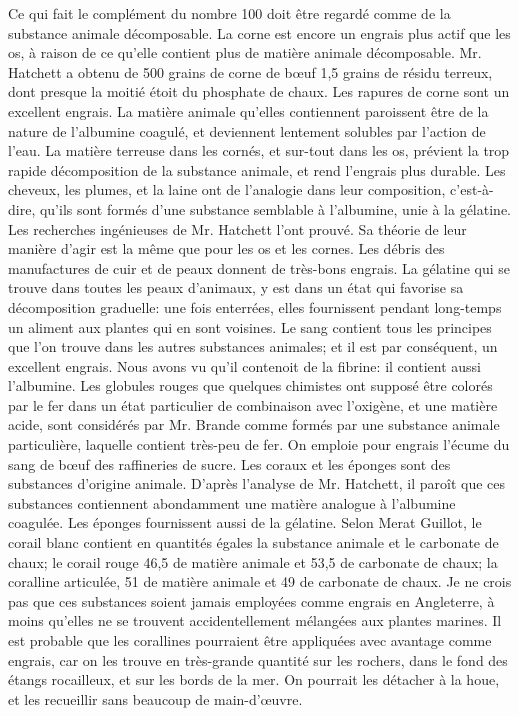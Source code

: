 Ce qui fait le complément du nombre 100 doit être regardé comme de la substance animale décomposable.
La corne est encore un engrais plus actif que les os, à raison de ce qu'elle contient plus de matière animale décomposable. Mr. Hatchett a obtenu de 500 grains de corne de bœuf 1,5 grains de résidu terreux, dont presque la moitié étoit du phosphate de chaux. Les rapures de corne sont un excellent engrais. La matière animale qu'elles contiennent\setcounter{page}{171} paroissent être de la nature de l'albumine coagulé, et deviennent lentement solubles par l'action de l'eau. La matière terreuse dans les cornés, et sur-tout dans les os, prévient la trop rapide décomposition de la substance animale, et rend l'engrais plus durable.
Les cheveux, les plumes, et la laine ont de l'analogie dans leur composition, c'est-à-dire, qu'ils sont formés d'une substance semblable à l'albumine, unie à la gélatine. Les recherches ingénieuses de Mr. Hatchett l'ont prouvé. Sa théorie de leur manière d'agir est la même que pour les os et les cornes.
Les débris des manufactures de cuir et de peaux donnent de très-bons engrais. La gélatine qui se trouve dans toutes les peaux d'animaux, y est dans un état qui favorise sa décomposition graduelle: une fois enterrées, elles fournissent pendant long-temps un aliment aux plantes qui en sont voisines.
Le sang contient tous les principes que l'on trouve dans les autres substances animales; et il est par conséquent, un excellent engrais. Nous avons vu qu'il contenoit de la fibrine: il contient aussi l'albumine. Les globules rouges que quelques chimistes ont supposé être colorés par le fer dans un état particulier\setcounter{page}{172} de combinaison avec l'oxigène, et une matière acide, sont considérés par Mr. Brande comme formés par une substance animale particulière, laquelle contient très-peu de fer.
On emploie pour engrais l'écume du sang de bœuf des raffineries de sucre.
Les coraux et les éponges sont des substances d'origine animale. D'après l'analyse de Mr. Hatchett, il paroît que ces substances contiennent abondamment une matière analogue à l'albumine coagulée. Les éponges fournissent aussi de la gélatine.
Selon Merat Guillot, le corail blanc contient en quantités égales la substance animale et le carbonate de chaux; le corail rouge 46,5 de matière animale et 53,5 de carbonate de chaux; la coralline articulée, 51 de matière animale et 49 de carbonate de chaux.
Je ne crois pas que ces substances soient jamais employées comme engrais en Angleterre, à moins qu'elles ne se trouvent accidentellement mélangées aux plantes marines. Il est probable que les corallines pourraient être appliquées avec avantage comme engrais, car on les trouve en très-grande quantité sur les rochers, dans le fond des étangs rocailleux, et sur les bords de la mer. On pourrait les détacher à la houe, et les\setcounter{page}{173} recueillir sans beaucoup de main-d'œuvre.
